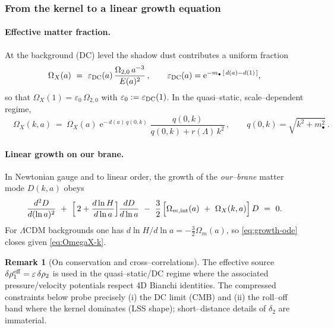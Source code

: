\documentclass[10pt]{article}
\theoremstyle{definition}
\newtheorem{remark}{Remark}[section]
\theoremstyle{plain}
\begin{document}
\subsubsection*{From the kernel to a linear growth equation}\label{subsubsec:uom-main-017}

\paragraph{Effective matter fraction.}\label{par:uom-main-173}
At the background (DC) level the shadow dust contributes a uniform fraction
\begin{equation}\label{eq:OmegaX-DC}
\Omega_X(a)\ =\ \varepsilon_{\rm DC}(a)\,\frac{\Omega_{2,0}\,a^{-3}}{E(a)^2}\,,
\qquad \varepsilon_{\rm DC}(a)=\mathrm{e}^{-m_\bullet\,[\,d(a)-d(1)\,]},
\end{equation}
so that $\Omega_X(1)=\varepsilon_0\,\Omega_{2,0}$ with $\varepsilon_0:=\varepsilon_{\rm DC}(1)$.
In the quasi–static, scale–dependent regime,
\begin{equation}\label{eq:OmegaX-k}
\boxed{\quad
\Omega_X(k,a)\ =\ \Omega_X(a)\;\mathrm{e}^{-\,d(a)\,q(0,k)}\;\frac{q(0,k)}{q(0,k)+r(\Lambda)\,k^2}\,,
\qquad q(0,k)=\sqrt{k^2+m_\bullet^2}\,.
\quad}
\end{equation}

\paragraph{Linear growth on our brane.}\label{par:uom-main-174}
In Newtonian gauge and to linear order, the growth of the \emph{our–brane} matter mode $D(k,a)$ obeys
\begin{equation}\label{eq:growth-ode}
\frac{d^2 D}{d(\ln a)^2}\ +\ \Bigl[\,2+\frac{d\ln H}{d\ln a}\Bigr]\frac{d D}{d\ln a}
\ -\ \frac{3}{2}\,\Bigl[\Omega_{m,\mathrm{int}}(a)\ +\ \Omega_X(k,a)\Bigr]\,D\ =\ 0.
\end{equation}
For $\Lambda$CDM backgrounds one has $d\ln H/d\ln a=-\tfrac{3}{2}\Omega_m(a)$, so \eqref{eq:growth-ode} closes given \eqref{eq:OmegaX-k}.

\begin{remark}[On conservation and cross–correlations]
\label{rem:uom-main-009}
The effective source $\delta\rho^{\rm eff}_1=\varepsilon\,\delta\rho_2$ is used in the quasi–static/DC regime where the associated
pressure/velocity potentials respect 4D Bianchi identities. The compressed constraints below probe precisely (i) the DC limit
(CMB) and (ii) the roll–off band where the kernel dominates (LSS shape); short–distance details of $\delta_2$ are immaterial.
\end{remark}
\end{document}
